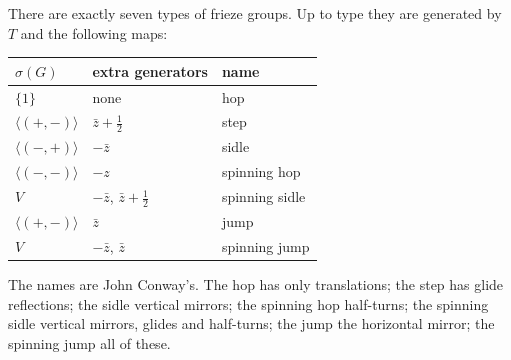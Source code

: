 \begin{theorem}\label{geometry:thm:friezes}
There are exactly seven types of frieze groups. Up to type they are generated by $T$ and the following maps:
\begin{center}
\begin{tabular}{@{}lll@{}}
\hline
$\sigma(G)$ & extra generators & name\\
\hline
$\{1\}$ & none & hop\\
$\langle(+,-)\rangle$ & $\bar z+\frac12$ & step\\
$\langle(-,+)\rangle$ & $-\bar z$ & sidle\\
$\langle(-,-)\rangle$ & $-z$ & spinning hop\\
$V$ & $-\bar z$, $\bar z+\frac12$ & spinning sidle\\
$\langle(+,-)\rangle$ & $\bar z$ & jump\\
$V$ & $-\bar z$, $\bar z$ & spinning jump\\
\hline
\end{tabular}
\end{center}
The names are John Conway's. The hop has only translations; the step has glide reflections; the sidle vertical mirrors; the spinning
hop half-turns; the spinning sidle vertical mirrors, glides and half-turns; the jump the horizontal mirror; the spinning jump all of
these.
\end{theorem}
